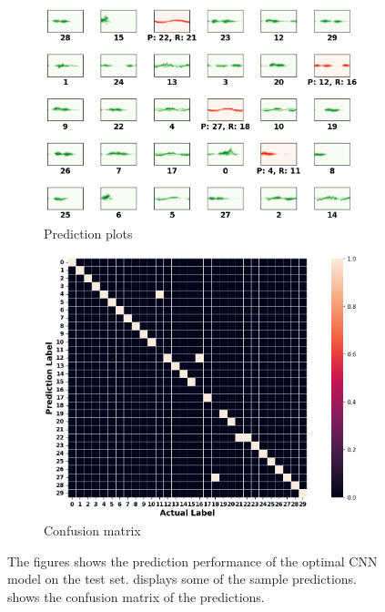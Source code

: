 \documentclass{l4proj}
\begin{document}
\begin{figure}[h]
    \centering
    \begin{subfigure}{0.4\textwidth}
        \includegraphics[width=\textwidth]{images/participant-final-test-prediction-plots.png}
        \caption{Prediction plots}
        \label{fig:participant-final-test-prediction-plots}
    \end{subfigure}
    \qquad
    \begin{subfigure}{0.4\textwidth}
        \includegraphics[width=\textwidth]{images/participant-final-test-confusion-matrix.png}
        \caption{Confusion matrix}
        \label{fig:participant-final-test-confusion-matrix}
    \end{subfigure}
    \caption{The figures shows the prediction performance of the optimal CNN model on the test set.  displays some of the sample predictions.  shows the confusion matrix of the predictions.}
    \label{fig:participant-final-prediction-plots-and-confusion-matrix}
\end{figure}
\end{document}
